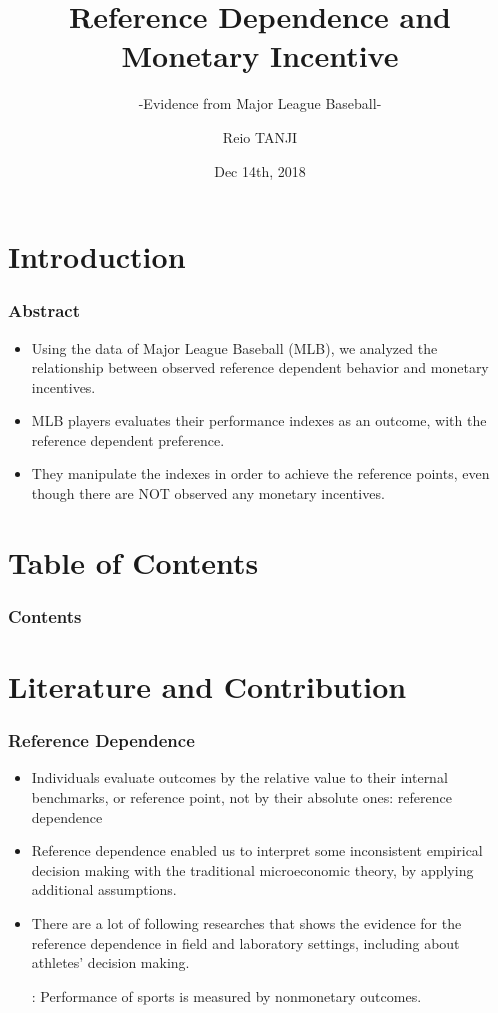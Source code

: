 \documentclass[dvipdfmx,12pt]{beamer}
\title{Reference Dependence and Monetary Incentive}
\subtitle{-Evidence from Major League Baseball-}
\author{Reio TANJI}
\date{Dec 14th, 2018}
\institute{Osaka University}
\begin{document}
\begin{frame}\frametitle{}
\titlepage
\end{frame}

\section{Introduction}

\begin{frame}\frametitle{Abstract}
  \begin{itemize}

    \item Using the data of Major League Baseball (MLB), we analyzed the relationship between observed reference dependent behavior and monetary incentives.

    \item MLB players evaluates their performance indexes as an outcome, with the reference dependent preference.

    \item They manipulate the indexes in order to achieve the reference points, even though there are NOT observed any monetary incentives.
  \end{itemize}
\end{frame}

\section*{Table of Contents}
\begin{frame}\frametitle{Contents}
  \tableofcontents
\end{frame}

\section{Literature and Contribution}
\begin{frame}\frametitle{Reference Dependence}
  \begin{itemize}
    \item Individuals evaluate outcomes by the relative value to their internal benchmarks, or reference point, not by their absolute ones: reference dependence

    \item Reference dependence enabled us to interpret some inconsistent empirical decision making with the traditional microeconomic theory, by applying additional assumptions.

    \item There are a lot of following researches that shows the evidence for the reference dependence in field and laboratory settings, including about athletes' decision making.

    : Performance of sports is measured by nonmonetary outcomes.

  \end{itemize}
\end{frame}
\end{document}
